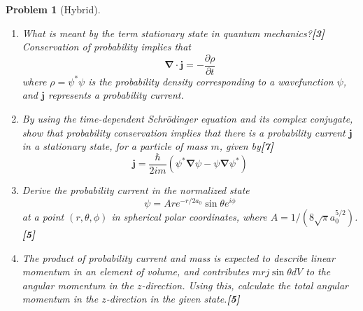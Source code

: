 \documentclass[a4paper]{article}
\theoremstyle{new}
\newtheorem{qns}{Problem}[subsection]
\begin{document}
\begin{qns}[Hybrid]\leavevmode
\begin{enumerate}[label=(\roman*)]
\item What is meant by the term stationary state in quantum mechanics?\hfill\textbf{[3]}\\[5pt]
Conservation of probability implies that
$$\boldsymbol{\nabla}\cdot\mathbf{j}=-\frac{\partial\rho}{\partial t}$$
where $\rho=\psi^*\psi$ is the probability density corresponding to a wavefunction $\psi$, and $\mathbf{j}$ represents a probability current.
\item By using the time-dependent Schrödinger equation and its complex conjugate, show that probability conservation implies that there is a probability current $\mathbf{j}$ in a stationary state, for a particle of mass $m$, given by\hfill\textbf{[7]}
$$\mathbf{j}=\frac{\hbar}{2im}(\psi^*\boldsymbol{\nabla}\psi-\psi\boldsymbol{\nabla}\psi^*)$$
\item Derive the probability current in the normalized state
$$\psi=Are^{-r/2a_0}\sin\theta e^{i\phi}$$
at a point $(r, \theta, \phi)$ in spherical polar coordinates, where $A=1/(8\sqrt{\pi}a_0^{5/2})$.\hfill\textbf{[5]}
\item The product of probability current and mass is expected to describe linear momentum in an element of volume, and contributes $mrj\sin\theta dV$ to the angular momentum in the $z$-direction. Using this, calculate the total angular momentum in the $z$-direction in the given state.\hfill\textbf{[5]}
\end{enumerate}
\begin{mdframed}
\end{mdframed}
\end{qns}
\end{document}
